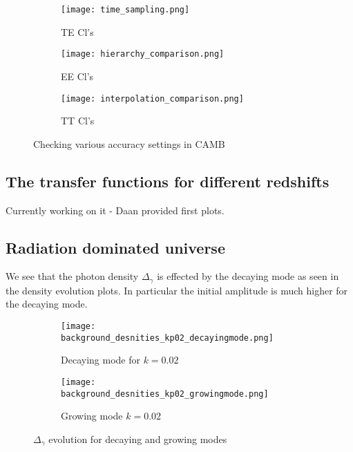\documentclass[12pt]{article}
\numberwithin{equation}{section}
\begin{document}
\begin{figure}[ht]\centering
        \begin{subfigure}{.5\textwidth}
               \texttt{[image: time\_sampling.png]}
               \caption{TE Cl's}
                \label{tsamp} 
        \end{subfigure}%
        \begin{subfigure}{.5\textwidth}
                \texttt{[image: hierarchy\_comparison.png]}
                \caption{EE Cl's}
                \label{hsamp}
        \end{subfigure}
	\begin{subfigure}{0.5\textwidth}
                \texttt{[image: interpolation\_comparison.png]}
                \caption{TT Cl's}
                \label{isamp}
        \end{subfigure}
       \caption{Checking various accuracy settings in CAMB} \label{accuracy}
\end{figure}


\subsection{The transfer functions for different redshifts}

Currently working on it - Daan provided first plots. 

\newpage
\subsection{Radiation dominated universe}

We see that the photon density $\Delta_\gamma$ is effected by the decaying mode as seen in the density evolution plots. In particular the initial amplitude is much higher for the decaying mode. 

 \begin{figure}[ht]\centering
        \begin{subfigure}{.5\textwidth}
               \texttt{[image: background\_desnities\_kp02\_decayingmode.png]}
               \caption{Decaying mode for $k=0.02$}
                \label{gamma_d} 
        \end{subfigure}%
        \begin{subfigure}{.5\textwidth}
                \texttt{[image: background\_desnities\_kp02\_growingmode.png]}
                \caption{Growing mode $k=0.02$}
                \label{gamma_g}
        \end{subfigure}
       \caption{$\Delta_\gamma$ evolution for decaying and growing modes} \label{gamma_sampling}
\end{figure}
\end{document}
